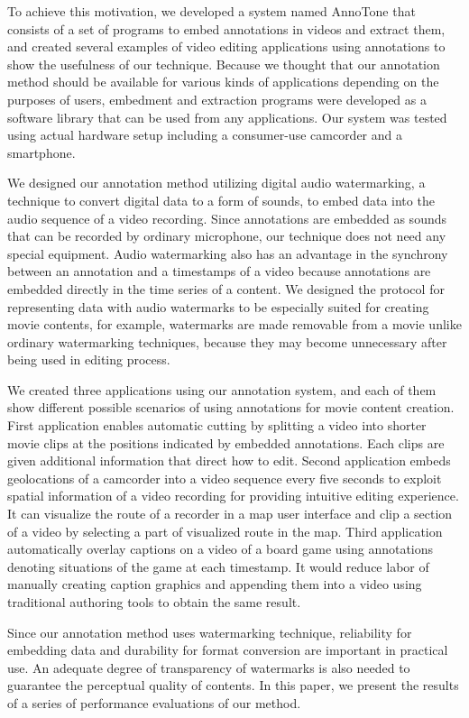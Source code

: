 To achieve this motivation, we developed a system named AnnoTone that consists of a set of programs to embed annotations in videos and extract them, and created several examples of video editing applications using annotations to show the usefulness of our technique.
Because we thought that our annotation method should be available for various kinds of applications depending on the purposes of users, embedment and extraction programs were developed as a software library that can be used from any applications.
Our system was tested using actual hardware setup including a consumer-use camcorder and a smartphone. %

We designed our annotation method utilizing digital audio watermarking, a technique to convert digital data to a form of sounds, to embed data into the audio sequence of a video recording.
Since annotations are embedded as sounds that can be recorded by ordinary microphone, our technique does not need any special equipment.
Audio watermarking also has an advantage in the synchrony between an annotation and a timestamps of a video because annotations are embedded directly in the time series of a content.
We designed the protocol for representing data with audio watermarks to be especially suited for creating movie contents, for example, watermarks are made removable from a movie unlike ordinary watermarking techniques, because they may become unnecessary after being used in editing process.

We created three applications using our annotation system, and each of them show different possible scenarios of using annotations for movie content creation.
First application enables automatic cutting by splitting a video into shorter movie clips at the positions indicated by embedded annotations.
Each clips are given additional information that direct how to edit.
Second application embeds geolocations of a camcorder into a video sequence every five seconds to exploit spatial information of a video recording for providing intuitive editing experience.
It can visualize the route of a recorder in a map user interface and clip a section of a video by selecting a part of visualized route in the map.
Third application automatically overlay captions on a video of a board game using annotations denoting situations of the game at each timestamp.
It would reduce labor of manually creating caption graphics and appending them into a video using traditional authoring tools to obtain the same result.

Since our annotation method uses watermarking technique, reliability for embedding data and durability for format conversion are important in practical use.
An adequate degree of transparency of watermarks is also needed to guarantee the perceptual quality of contents.
In this paper, we present the results of a series of performance evaluations of our method.
